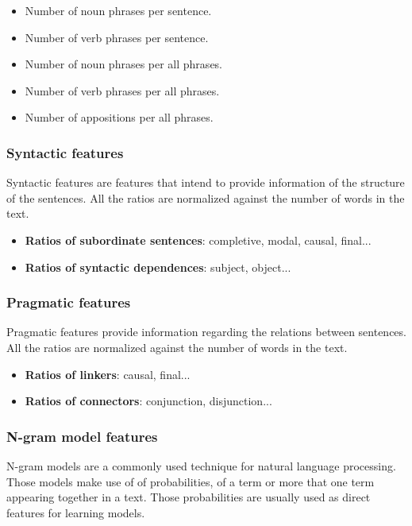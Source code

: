 \documentclass{acm_proc_article-sp}
\begin{document}
\begin{itemize}
\item Number of noun phrases per sentence.
\item Number of verb phrases per sentence.
\item Number of noun phrases per all phrases.
\item Number of verb phrases per all phrases.
\item Number of appositions per all phrases.
\end{itemize}


\subsubsection{Syntactic features}
Syntactic features are features that intend to provide information of the structure of the sentences. All the ratios are normalized against the number of words in the text.
\begin{itemize}
\item {\bf Ratios of subordinate sentences}: completive, modal, causal, final...

\item {\bf Ratios of syntactic dependences}: subject, object...



\end{itemize}

\subsubsection{Pragmatic features}
Pragmatic features provide information regarding the relations between sentences. All the ratios are normalized against the number of words in the text.
\begin{itemize}
\item {\bf Ratios of linkers}: causal, final...

\item {\bf Ratios of connectors}: conjunction, disjunction...

\end{itemize}

\subsubsection{N-gram model features}
N-gram models are a commonly used technique for natural language processing. Those models make use of of probabilities, of a term or more that one term appearing together in a text. Those probabilities are usually used as direct features for learning models.
\end{document}
